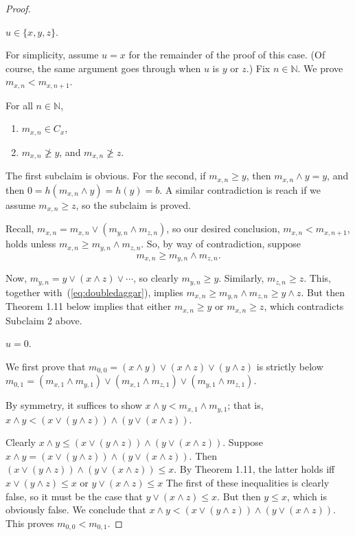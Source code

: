 \begin{proof}\
  
 $u \in \{x, y, z\}$.
    
  For simplicity, assume $u = x$ for the remainder of the proof of this case.  (Of course, the same argument goes through when $u$ is $y$ or $z$.) Fix $n \in \mathbb N$.  We prove $m_{x,n} < m_{x,n+1}$.

 For all $n\in \mathbb N$,
  \begin{enumerate}
  \item 
  $m_{x,n}\in C_x$, 
  \item $m_{x,n}\ngeq y$, and $m_{x,n}\ngeq z$.
  \end{enumerate}
  The first subclaim is obvious. For the second, if $m_{x,n}\geqslant y$, then $m_{x,n}\wedge y = y$, and then $0 = h(m_{x,n}\wedge y) = h(y) = b$.  A similar contradiction is reach if we assume $m_{x,n}\geqslant z$, so the subclaim is proved.

  Recall, $m_{x, n} = m_{x,n} \vee (m_{y,n} \wedge m_{z,n})$, so our desired conclusion, $m_{x,n} < m_{x,n+1}$, holds unless 
  $m_{x,n} \geqslant m_{y,n} \wedge m_{z,n}$.
  So, by way of contradiction, suppose 
  \begin{equation}\label{eq:doubledaggar}
  m_{x,n} \geqslant m_{y,n} \wedge m_{z,n}.
  \end{equation}

  Now, $m_{y,n} = y \vee (x \wedge z) \vee \cdots$, so clearly $m_{y,n} \geqslant y$.  Similarly, $m_{z,n} \geqslant z$.
  This, together with~(\ref{eq:doubledaggar}), implies $m_{x,n} \geqslant m_{y,n} \wedge m_{z,n} \geqslant y \wedge z$.  But then Theorem 1.11 below implies that either $m_{x,n} \geqslant y$ or $m_{x,n} \geqslant z$, which contradicts Subclaim 2 above.

  \medskip

 $u = 0$.
  
  We first prove that $m_{0, 0} = (x\wedge y) \vee (x\wedge z)\vee (y\wedge z)$ is strictly below $m_{0, 1} = 
  (m_{x,1}\wedge m_{y,1}) \vee (m_{x,1}\wedge m_{z,1}) \vee (m_{y,1}\wedge m_{z,1})$.

  By symmetry, it suffices to show $x\wedge y < m_{x,1}\wedge m_{y,1}$;
  that is, $x\wedge y < (x \vee (y\wedge z))\wedge (y \vee (x\wedge z))$.

  Clearly 
  $x\wedge y \leqslant (x \vee (y\wedge z))\wedge (y \vee (x\wedge z))$. Suppose $x\wedge y = (x \vee (y\wedge z))\wedge (y \vee (x\wedge z))$. Then $(x \vee (y\wedge z))\wedge (y \vee (x\wedge z))\leqslant x$.
  By Theorem 1.11, the latter holds iff
  $x \vee (y\wedge z)\leqslant x$ or
  $y \vee (x\wedge z)\leqslant x$
  The first of these inequalities is clearly false, so it must be the case that $y \vee (x\wedge z)\leqslant x$.  But then $y \leqslant x$, which is obviously false.  We conclude that
  $x\wedge y <(x \vee (y\wedge z))\wedge (y \vee (x\wedge z))$.
  This proves $m_{0,0} < m_{0,1}$.


\end{proof}
